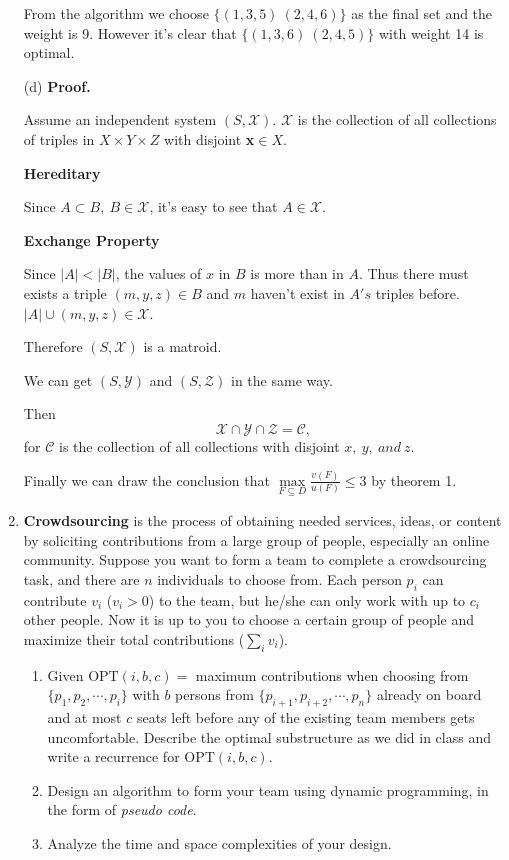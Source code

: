 \documentclass[12pt,a4paper]{article}
\theoremstyle{definition}
\begin{document}
\begin{enumerate}
	From the algorithm we choose $\{(1,3,5)\ (2,4,6)\}$ as the final set and the weight is 9. However it's clear that $\{(1,3,6)\ (2,4,5)\}$ with weight 14 is optimal.

	(d) \textbf{Proof.}

	Assume an independent system $(S,\mathcal{X})$. $\mathcal{X}$ is the collection of all collections of triples in $X\times Y\times Z$ with disjoint \textbf{x}$\in X$.

	\textbf{Hereditary}

	Since $A\subset B,\ B\in \mathcal{X}$, it's easy to see that $A\in \mathcal{X}$.

	\textbf{Exchange Property}

	Since $|A|<|B|$, the values of $x$ in $B$ is more than in $A$. Thus there must exists a triple $(m,y,z)\in B$ and $m$ haven't exist in $A's$ triples before.
	$|A|\cup {(m,y,z)}\in \mathcal{X}$. 

	Therefore $(S,\mathcal{X})$ is a matroid.

	We can get $(S,\mathcal{Y})$ and $(S,\mathcal{Z})$ in the same way.

	Then $$\mathcal{X} \cap \mathcal{Y} \cap\mathcal{Z} =\mathcal{C},$$
	for $\mathcal{C}$ is the collection of all collections with disjoint $x,\ y, \ and \ z$.

	Finally we can draw the conclusion that $\max\limits_{F \subseteq D} \frac{v(F)}{u(F)} \leq 3$ by theorem 1.
	\item
	\textbf{Crowdsourcing} is the process of obtaining needed services, ideas, or content by soliciting contributions from a large group of people, especially an online community. Suppose you want to form a team to complete a crowdsourcing task, and there are $n$ individuals to choose from. Each person $p_i$ can contribute $v_i$ ($v_i > 0$) to the team, but he/she can only work with up to $c_i$ other people. Now it is up to you to choose a certain group of people and maximize their total contributions ($\sum_i{v_i}$).
	
	\begin{enumerate}
		\item Given $\text{OPT}(i, b, c)=$ maximum contributions when choosing from $\{p_1, p_2, \cdots, p_i\}$ with $b$ persons from $\{p_{i+1}, p_{i+2}, \cdots, p_n\}$ already on board and at most $c$ seats left before any of the existing team members gets uncomfortable. Describe the optimal substructure as we did in class and write a recurrence for $\text{OPT}(i, b, c)$.
		\item Design an algorithm to form your team using dynamic programming, in the form of \emph{pseudo code}.
        \item Analyze the time and space complexities of your design.
	\end{enumerate}
\end{enumerate}
\end{document}
